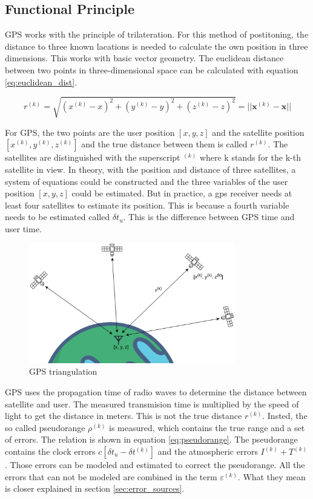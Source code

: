 \subsection{Functional Principle}

GPS works with the principle of trilateration.
For this method of postitoning, the distance to three known lacations is needed to calculate the own position in three dimensions.
This works with basic vector geometry.
The euclidean distance between two points in three-dimensional space can be calculated with equation \ref{eq:euclidean_dist}.

\begin{equation}
 r^{(k)} = \sqrt{(x^{(k)} - x)^2 + (y^{(k)} - y)^2 + (z^{(k)} - z)^2} = \lvert\lvert \textbf{x}^{(k)} - \textbf{x} \rvert\rvert		\label{eq:euclidean_dist}
\end{equation}

For GPS, the two points are the user position $[x, y, z]$ and the satellite position $[x^{(k)}, y^{(k)}, z^{(k)}]$ and the true distance between them is called $r^{(k)}$.
The satellites are distinguished with the superscript $^{(k)}$ where k stands for the k-th satellite in view.
In theory, with the position and distance of three satellites, a system of equations could be constructed and the three variables of the user position $[x, y, z]$ could be estimated.
But in practice, a gps receiver needs at least four satellites to estimate its position.
This is because a fourth variable needs to be estimated called $\delta t_u$.
This is the difference between GPS time and user time.

\begin{figure}[ht]
 \centering
 \includegraphics[width=0.8\textwidth]{images/Position_Estimation.png}
 \caption{GPS triangulation}
 \label{fig:triangulation}
\end{figure}

GPS uses the propagation time of radio waves to determine the distance between satellite and user.
The measured transmision time is multiplied by the speed of light to get the distance in meters.
This is not the true distance $r^{(k)}$.
Insted, the so called pseudorange $\rho^{(k)}$ is measured, which contains the true range and a set of errors.
The relation is shown in equation \ref{eq:pseudorange}.
The pseudorange contains the clock errors $c[\delta t_u - \delta t^{(k)}]$ and the atmospheric errors $I^{(k)} + T^{(k)}$.
Those errors can be modeled and estimated to correct the pseudorange.
All the errors that can not be modeled are combined in the term $\varepsilon^{(k)}$.
What they mean is closer explained in section \ref{sec:error_sources}.

